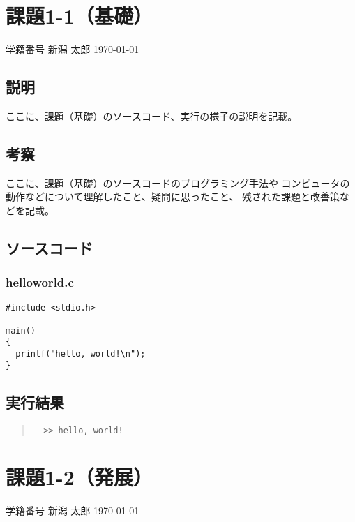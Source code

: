 \documentclass[a4paper,12pt]{jsarticle}
\newcommand{\mynumber}{学籍番号} %
\newcommand{\myname}{新潟 太郎} %
\newcommand{\myheader}{ %
\begin{flushright}
\mynumber\hspace{1zw} \myname\hspace{1zw} \today\end{flushright}}
\begin{document}
\section*{課題1-1（基礎）}
\myheader

\subsection*{説明}

ここに、課題（基礎）のソースコード、実行の様子の説明を記載。

\subsection*{考察}

ここに、課題（基礎）のソースコードのプログラミング手法や
コンピュータの動作などについて理解したこと、疑問に思ったこと、
残された課題と改善策などを記載。

\subsection*{ソースコード}

\subsubsection*{helloworld.c}
\begin{lstlisting}[basicstyle=\ttfamily\footnotesize, frame=single]
#include <stdio.h>

main()
{
  printf("hello, world!\n");
}
\end{lstlisting}

\subsection*{実行結果}

\begin{quote}
\begin{verbatim}
  >> hello, world!

\end{verbatim}
\end{quote}

\newpage
\section*{課題1-2（発展）}
\myheader
\end{document}
